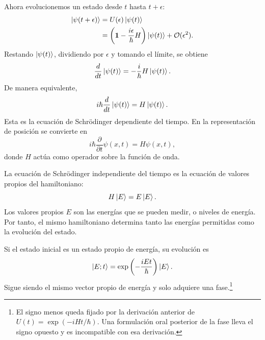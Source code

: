Ahora evolucionemos un estado desde \(t\) hasta \(t+\epsilon\):
\begin{align}
\left\lvert\psi(t+\epsilon)\right\rangle
&=
U(\epsilon)\left\lvert\psi(t)\right\rangle
\\
&=
\left(
\mathbf 1-\frac{i\epsilon}{\hbar}H
\right)\left\lvert\psi(t)\right\rangle
+\mathcal O(\epsilon^2).
\end{align}
Restando \(\left\lvert\psi(t)\right\rangle\), dividiendo por \(\epsilon\) y tomando el límite, se obtiene
\begin{equation}
\frac{d}{dt}\left\lvert\psi(t)\right\rangle
=
-\frac{i}{\hbar}H\left\lvert\psi(t)\right\rangle.
\end{equation}
De manera equivalente,
\begin{equation}
i\hbar\frac{d}{dt}\left\lvert\psi(t)\right\rangle
=
H\left\lvert\psi(t)\right\rangle.
\end{equation}
Esta es la ecuación de Schr\"odinger dependiente del tiempo. En la representación de posición se convierte en
\begin{equation}
i\hbar\frac{\partial}{\partial t}\psi(x,t)
=
H\psi(x,t),
\end{equation}
donde \(H\) actúa como operador sobre la función de onda.

La ecuación de Schr\"odinger independiente del tiempo es la ecuación de valores propios del hamiltoniano:
\begin{equation}
H\left\lvert E\right\rangle=E\left\lvert E\right\rangle.
\end{equation}
Los valores propios \(E\) son las energías que se pueden medir, o niveles de energía. Por tanto, el mismo hamiltoniano determina tanto las energías permitidas como la evolución del estado.

Si el estado inicial es un estado propio de energía, su evolución es
\begin{equation}
\left\lvert E;t\right\rangle
=
\exp\left(-\frac{iEt}{\hbar}\right)\left\lvert E\right\rangle.
\end{equation}
Sigue siendo el mismo vector propio de energía y solo adquiere una fase.\footnote{El signo menos queda fijado por la derivación anterior de \(U(t)=\exp(-iHt/\hbar)\). Una formulación oral posterior de la fase lleva el signo opuesto y es incompatible con esa derivación.}

\begin{classroomqa}
\end{classroomqa}

